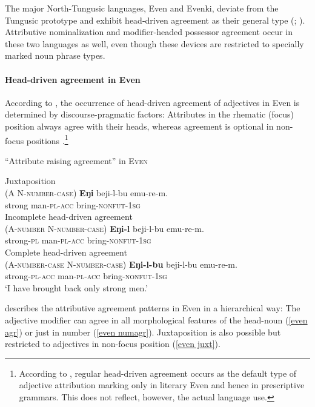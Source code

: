 \noindent The major North-Tungusic languages, Even and Evenki, deviate from the Tungusic prototype and exhibit head-driven agreement as their general type (\citealt[11]{malchukov1995}; \citealt[18]{bulatova-etal1999}). Attributive nominalization and modifier-headed possessor agreement occur in these two languages as well, even though these devices are restricted to specially marked noun phrase types.

\paragraph{Head-driven agreement in Even}
According to \citet[20]{malchukov1995}, the occurrence of head-driven agreement of adjectives in Even is determined by discourse-pragmatic factors: Attributes in the rhematic (focus) position always agree with their heads, whereas agreement is optional in non-focus positions \cite[31–32]{malchukov1995}.\footnote{According to \cite[31]{malchukov1995}, regular head-driven agreement occurs as the default type of adjective attribution marking only in literary Even and hence in prescriptive grammars. This does not reflect, however, the actual language use.}
\begin{exe}
\ex “Attribute raising agreement” in \textsc{Even}
\cite[30–31]{malchukov1995} \label{even raising}
\begin{xlist}
\ex 	Juxtaposition\\(A N-\textsc{number}-\textsc{case}) \label{even juxt}
\gll	\textbf{Eŋi} beji-l-bu emu-re-m.\\
	strong man-\textsc{pl}-\textsc{acc} bring-\textsc{nonfut}-\textsc{1sg}\\
\ex	Incomplete head-driven agreement\\(A-\textsc{number} N-\textsc{number}-\textsc{case}) \label{even numagr}
\gll	\textbf{Eŋi-l} beji-l-bu emu-re-m.\\
	strong-\textsc{pl} man-\textsc{pl}-\textsc{acc} bring-\textsc{nonfut}-\textsc{1sg}\\
\ex	Complete head-driven agreement\\(A-\textsc{number}-\textsc{case} N-\textsc{number}-\textsc{case}) \label{even agr}
\gll	\textbf{Eŋi-l-bu} beji-l-bu emu-re-m.\\
	strong-\textsc{pl}-\textsc{acc} man-\textsc{pl}-\textsc{acc} bring-\textsc{nonfut}-\textsc{1sg}\\
\glt	‘I have brought back only strong men.’
\end{xlist}
\end{exe}
\citet[30–31]{malchukov1995} describes the attributive agreement patterns in Even in a hierarchical way: The adjective modifier can agree in all morphological features of the head-noun (\ref{even agr}) or just in number (\ref{even numagr}). Juxtaposition is also possible but restricted to adjectives in non-focus position (\ref{even juxt}).

